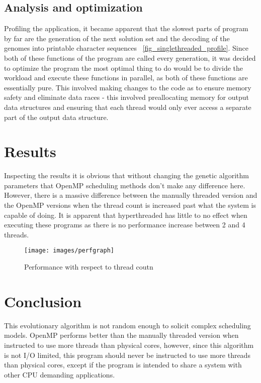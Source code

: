 \documentclass[journal,transmag]{IEEEtran}
\begin{document}
        \subsection{Analysis and optimization} 
        Profiling the application, it became apparent that the slowest parts of program
        by far are the generation of the next solution set and the decoding of the genomes
        into printable character sequences ~\ref{fig_singlethreaded_profile}. Since both of these
        functions of the program are called every generation, it was decided to optimize the program
        the most optimal thing to do would be to divide the workload and execute these
        functions in parallel, as both of these functions are essentially pure. This involved making
        changes to the code as to ensure memory safety and eliminate data races - this involved
        preallocating memory for output data structures and ensuring that each thread would
        only ever access a separate part of the output data structure. 

        

        
        
        
        

\section{Results}
Inspecting the results it is obvious that without changing the genetic algorithm parameters
that OpenMP scheduling methods don't make any difference here. However, there is a massive
difference between the manually threaded version and the OpenMP versions when the thread count
is increased past what the system is capable of doing. It is apparent that hyperthreaded
has little to no effect when executing these programs as there is no performance increase
between 2 and 4 threads.

	
	
\begin{figure}[!t]
\centering
\texttt{[image: images/perfgraph]}
\caption{Performance with respect to thread coutn}
\label{fig_performance_dif}
\end{figure}


\section{Conclusion}
This evolutionary algorithm is not  random enough to solicit complex scheduling models.
OpenMP performs better than the manually threaded version when instructed to use more 
threads than physical cores, however, since this algorithm is not I/O limited, this
program should never be instructed to use more threads than physical cores, except if
the program is intended to share a system with other CPU demanding applications.
\end{document}
